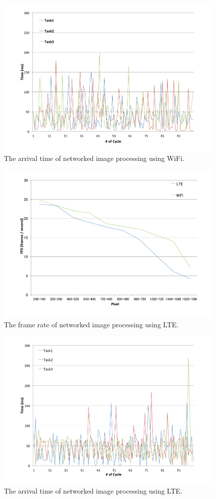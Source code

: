 \begin{figure}[!t]
 \centering
 \includegraphics[width=0.8\hsize]{fig/No9_TIPiC_serv_cycle_WiFi.pdf}
 \caption{The arrival time of networked image processing using WiFi.}
 \label{fig:no9}
\end{figure}

\begin{figure}[!t]
 \centering
 \includegraphics[width=0.8\hsize]{fig/No10_TIPiC_FPS_graph_LTE.pdf}
 \caption{The frame rate of networked image processing using LTE.}
 \label{fig:no10}
\end{figure}

\begin{figure}[!t]
 \centering
 \includegraphics[width=0.8\hsize]{fig/No11_TIPiC_serv_cycle_LTE.pdf}
 \caption{The arrival time of networked image processing using LTE.}
 \label{fig:no11}
\end{figure}

